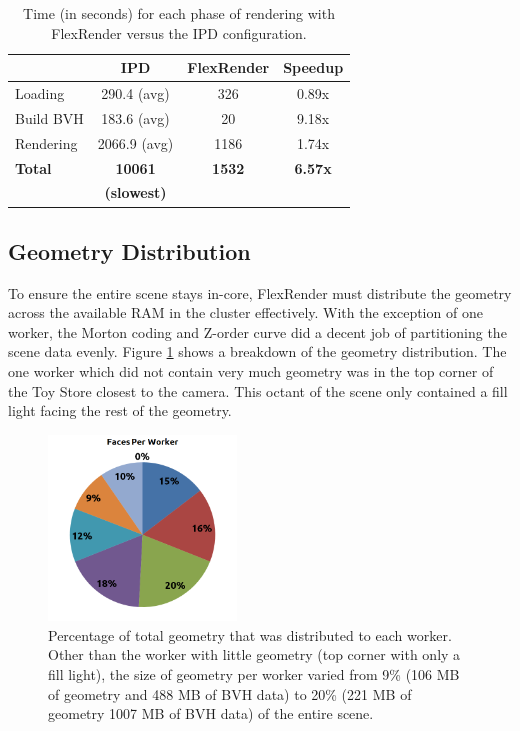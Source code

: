 \documentclass[a4paper,twoside]{article}
\begin{document}
\begin{table}
\begin{center}
\begin{tabular}{|l||c|c|c|}
    \hline
    & IPD & FlexRender & Speedup \\
    \hline
    \hline
    Loading & 290.4 (avg) & 326 & 0.89x \\
    \hline
    Build BVH & 183.6 (avg) & 20 & 9.18x \\
    \hline
    Rendering & 2066.9 (avg) & 1186 & 1.74x \\
    \hline
    \hline
    \textbf{Total} & \textbf{10061} & \textbf{1532} & \textbf{6.57x} \\
    & \textbf{(slowest)} & & \\
    \hline
\end{tabular}
\caption{Time (in seconds) for each phase of rendering with FlexRender versus the IPD configuration.}
\label{tb:flexrendertimes}
\end{center}
\end{table}

\subsection{Geometry Distribution}
\label{geomdist}

To ensure the entire scene stays in-core, FlexRender must distribute the
geometry across the available RAM in the cluster effectively. With the exception
of one worker, the Morton coding and Z-order curve did a decent job of
partitioning the scene data evenly. Figure \ref{fig:geomdist} shows a breakdown
of the geometry distribution. The one worker which did not contain very much
geometry was in the top corner of the Toy Store closest to the camera. This
octant of the scene only contained a fill light facing the rest of the geometry.

\begin{figure}[h!]
    \centering
    \includegraphics[width=50mm]{figures/facesperworker.png}
    \caption{Percentage of total geometry that was distributed to each worker. Other than the worker with little geometry (top corner with only a fill light), the size of geometry per worker varied from 9\% (106 MB of geometry and 488 MB of BVH data) to 20\% (221 MB of geometry 1007 MB of BVH data) of the entire scene.}
    \label{fig:geomdist}
\end{figure}
\end{document}
